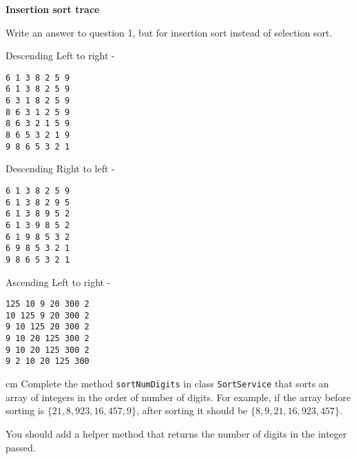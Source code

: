 \begin{questions}

\vskip 0.5cm
\question  \textbf{Insertion sort trace} \vskip 0.5cm

Write an answer to question 1, but for insertion sort instead of selection sort.

\begin{solution}
Descending Left to right -
\begin{verbatim}
6 1 3 8 2 5 9
6 1 3 8 2 5 9
6 3 1 8 2 5 9
8 6 3 1 2 5 9
8 6 3 2 1 5 9
8 6 5 3 2 1 9
9 8 6 5 3 2 1
\end{verbatim}

Descending Right to left -
\begin{verbatim}
6 1 3 8 2 5 9
6 1 3 8 2 9 5
6 1 3 8 9 5 2
6 1 3 9 8 5 2
6 1 9 8 5 3 2
6 9 8 5 3 2 1
9 8 6 5 3 2 1
\end{verbatim}

Ascending Left to right -
\begin{verbatim}
125 10 9 20 300 2
10 125 9 20 300 2
9 10 125 20 300 2
9 10 20 125 300 2
9 10 20 125 300 2
9 2 10 20 125 300
\end{verbatim}
\end{solution}

 cm \question  Complete the method \texttt{sortNumDigits} in class \texttt{SortService} that sorts an array of integers in the order of number of digits. For example, if the array before sorting is $\{21, 8, 923, 16, 457, 9\}$, after sorting it should be $\{8, 9, 21, 16, 923, 457\}$. 

You should add a helper method that returns the number of digits in the integer passed. 


\end{questions}
